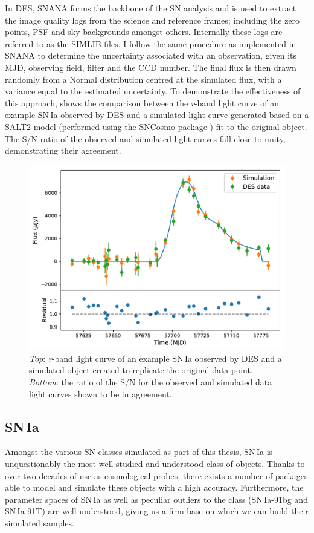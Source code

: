 In DES, SNANA forms the backbone of the SN analysis and is used to extract the image quality logs from the science and reference frames; including the zero points, PSF and sky backgrounds amongst others. Internally these logs are referred to as the \textsc{SIMLIB} files. I follow the same procedure as implemented in SNANA to determine the uncertainty associated with an observation, given its MJD, observing field, filter and the CCD number. The final flux is then drawn randomly from a Normal distribution centred at the simulated flux, with a variance equal to the estimated uncertainty. To demonstrate the effectiveness of this approach,  shows the comparison between the \textit{r}-band light curve of an example SN\,Ia observed by DES and a simulated light curve generated based on a SALT2 model (performed using the SNCosmo package \citep{Barbary2014}) fit to the original object. The S/N ratio of the observed and simulated light curves fall close to unity, demonstrating their agreement.

\begin{figure}
  \includegraphics[width=\textwidth]{Figures/Chapter5/IaSim.pdf}
  \caption{\textit{Top}: \textit{r}-band light curve of an example SN\,Ia observed by DES and a simulated object created to replicate the original data point. \textit{Bottom}: the ratio of the S/N for the observed and simulated data light curves shown to be in agreement.}
  \label{fig:IaNoiseComp}
\end{figure}

\subsection{SN\,Ia}
Amongst the various SN classes simulated as part of this thesis, SN\,Ia is unquestionably the most well-studied and understood class of objects. Thanks to over two decades of use as cosmological probes, there exists a number of packages able to model and simulate these objects with a high accuracy. Furthermore, the parameter spaces of SN\,Ia as well as peculiar outliers to the class (SN\,Ia-91bg and SN\,Ia-91T) are well understood, giving us a firm base on which we can build their simulated samples.

